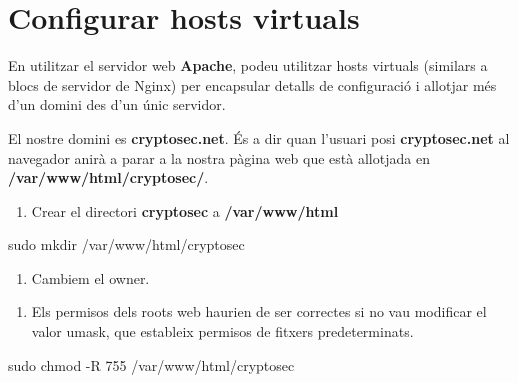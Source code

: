 \documentclass[]{article}
\newenvironment{Shaded}{}{}
\newcommand{\FunctionTok}[1]{\textcolor[rgb]{0.02,0.16,0.49}{#1}}
\newcommand{\NormalTok}[1]{#1}
\newcommand{\VariableTok}[1]{\textcolor[rgb]{0.10,0.09,0.49}{#1}}
\providecommand{\tightlist}{%
  \setlength{\itemsep}{0pt}\setlength{\parskip}{0pt}}
\begin{document}
\hypertarget{configurar-hosts-virtuals}{%
\section{\texorpdfstring{\textbf{Configurar hosts
virtuals}}{Configurar hosts virtuals}}\label{configurar-hosts-virtuals}}

En utilitzar el servidor web \textbf{Apache}, podeu utilitzar hosts
virtuals (similars a blocs de servidor de Nginx) per encapsular detalls
de configuració i allotjar més d'un domini des d'un únic servidor.

El nostre domini es \textbf{cryptosec.net}. És a dir quan l'usuari posi
\textbf{cryptosec.net} al navegador anirà a parar a la nostra pàgina web
que està allotjada en \textbf{/var/www/html/cryptosec/}.

\begin{enumerate}
\def\labelenumi{\arabic{enumi}.}
\tightlist
\item
  Crear el directori \textbf{cryptosec} a \textbf{/var/www/html}
\end{enumerate}

\begin{Shaded}
\begin{Highlighting}[]
\FunctionTok{sudo}\NormalTok{ mkdir /var/www/html/cryptosec}
\end{Highlighting}
\end{Shaded}

\begin{enumerate}
\def\labelenumi{\arabic{enumi}.}
\setcounter{enumi}{1}
\tightlist
\item
  Cambiem el owner.
\end{enumerate}

\begin{Shaded}
\end{Shaded}

\begin{enumerate}
\def\labelenumi{\arabic{enumi}.}
\setcounter{enumi}{2}
\tightlist
\item
  Els permisos dels roots web haurien de ser correctes si no vau
  modificar el valor umask, que estableix permisos de fitxers
  predeterminats.
\end{enumerate}

\begin{Shaded}
\begin{Highlighting}[]
\FunctionTok{sudo}\NormalTok{ chmod -R 755 /var/www/html/cryptosec}
\end{Highlighting}
\end{Shaded}
\end{document}

